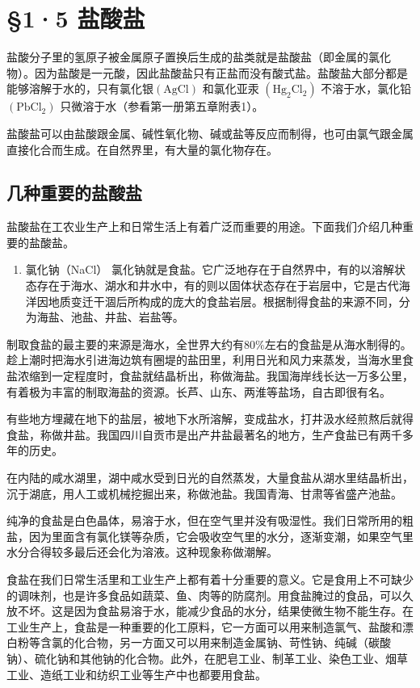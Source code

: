 \section{§1·5 盐酸盐}

盐酸分子里的氢原子被金属原子置换后生成的盐类就是盐酸盐（即金属的氯化物）。因为盐酸是一元酸，因此盐酸盐只有正盐而没有酸式盐。盐酸盐大部分都是能够溶解于水的，只有氯化银\(\left(\mathrm{AgCl}\right)\)
和氯化亚汞 \(\left(\mathrm{Hg}_{2}\mathrm{Cl}_{2}\right)\)
不溶于水，氯化铅 \(\left(\mathrm{PbCl}_{2}\right)\)
只微溶于水（参看第一册第五章附表1）。

盐酸盐可以由盐酸跟金属、碱性氧化物、碱或盐等反应而制得，也可由氯气跟金属直接化合而生成。在自然界里，有大量的氯化物存在。

\subsection{几种重要的盐酸盐}

盐酸盐在工农业生产上和日常生活上有着广泛而重要的用途。下面我们介绍几种重要的盐酸盐。

\begin{enumerate}
\item
  氯化钠（NaCl）
  氯化钠就是食盐。它广泛地存在于自然界中，有的以溶解状态存在于海水、湖水和井水中，有的则以固体状态存在于岩层中，它是古代海洋因地质变迁干涸后所构成的庞大的食盐岩层。根据制得食盐的来源不同，分为海盐、池盐、井盐、岩盐等。
\end{enumerate}

制取食盐的最主要的来源是海水，全世界大约有80\%左右的食盐是从海水制得的。趁上潮时把海水引进海边筑有圈堤的盐田里，利用日光和风力来蒸发，当海水里食盐浓缩到一定程度时，食盐就结晶析出，称做海盐。我国海岸线长达一万多公里，有着极为丰富的制取海盐的资源。长芦、山东、两淮等盐场，自古即很有名。

有些地方埋藏在地下的盐层，被地下水所溶解，变成盐水，打井汲水经煎熬后就得食盐，称做井盐。我国四川自贡市是出产井盐最著名的地方，生产食盐已有两千多年的历史。

在内陆的咸水湖里，湖中咸水受到日光的自然蒸发，大量食盐从湖水里结晶析出，沉于湖底，用人工或机械挖掘出来，称做池盐。我国青海、甘肃等省盛产池盐。

纯净的食盐是白色晶体，易溶于水，但在空气里并没有吸湿性。我们日常所用的粗盐，因为里面含有氯化镁等杂质，它会吸收空气里的水分，逐渐变潮，如果空气里水分合得较多最后还会化为溶液。这种现象称做潮解。

食盐在我们日常生活里和工业生产上都有着十分重要的意义。它是食用上不可缺少的调味剂，也是许多食品如蔬菜、鱼、肉等的防腐剂。用食盐腌过的食品，可以久放不坏。这是因为食盐易溶于水，能减少食品的水分，结果使微生物不能生存。在工业生产上，食盐是一种重要的化工原料，它一方面可以用来制造氯气、盐酸和漂白粉等含氯的化合物，另一方面又可以用来制造金属钠、苛性钠、纯碱（碳酸钠）、硫化钠和其他钠的化合物。此外，在肥皂工业、制革工业、染色工业、烟草工业、造纸工业和纺织工业等生产中也都要用食盐。

